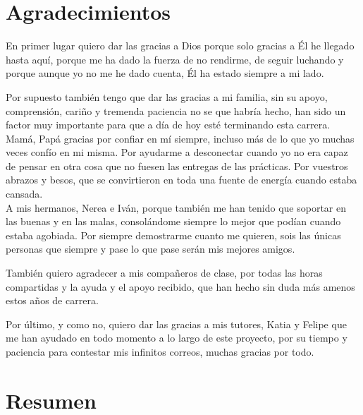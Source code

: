 \documentclass[a4paper, 12pt]{book}
\begin{document}

\chapter*{Agradecimientos}

En primer lugar quiero dar las gracias a Dios porque solo gracias a Él he llegado hasta aquí, porque me ha dado la fuerza de no rendirme, de seguir luchando y porque aunque yo no me he dado cuenta, Él ha estado siempre a mi lado.

Por supuesto también tengo que dar las gracias a mi familia, sin su apoyo, comprensión, cariño y tremenda paciencia no se que habría hecho, han sido un factor muy importante para que a día de hoy esté terminando esta carrera. Mamá, Papá gracias por confiar en mí siempre, incluso más de lo que yo muchas veces confío en mi misma. Por ayudarme a desconectar cuando yo no era capaz de pensar en otra cosa que no fuesen las entregas de las prácticas. Por vuestros abrazos y besos, que se convirtieron en toda una fuente de energía cuando estaba cansada. \\
A mis hermanos, Nerea e Iván, porque también me han tenido que soportar en las buenas y en las malas, consolándome siempre lo mejor que podían cuando estaba agobiada. Por siempre demostrarme cuanto me quieren, sois las únicas personas que siempre y pase lo que pase serán mis mejores amigos.

También quiero agradecer a mis compañeros de clase, por todas las horas compartidas y la ayuda y el apoyo recibido, que han hecho sin duda más amenos estos años de carrera.

Por último, y como no, quiero dar las gracias a mis tutores, Katia y Felipe que me han ayudado en todo momento a lo largo de este proyecto, por su tiempo y paciencia para contestar mis infinitos correos, muchas gracias por todo.



\chapter*{Resumen}
\end{document}
